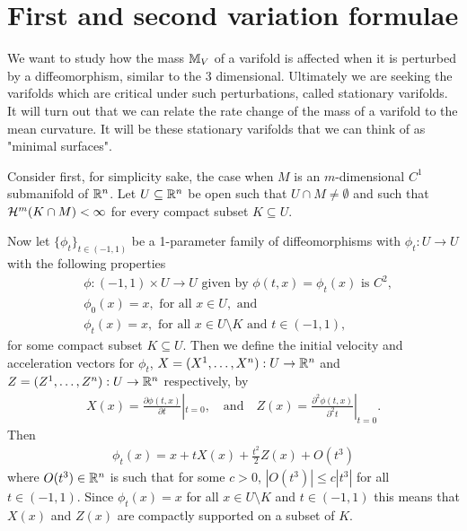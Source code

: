 \section{First and second variation formulae}
We want to study how the mass $\mathbb{M}_V$ of a varifold is affected when it is perturbed by a diffeomorphism, similar to the 3 dimensional. Ultimately we are seeking the varifolds which are critical under such perturbations, called stationary varifolds. It will turn out that we can relate the rate change of the mass of a varifold to the mean curvature. It will be these stationary varifolds that we can think of as "minimal surfaces".

Consider first, for simplicity sake, the case when $M$ is an $m$-dimensional $C^1$ submanifold of $\mathbb{R}^n$. Let $U \subseteq \mathbb{R}^n$ be open such that $U \cap M \neq \emptyset$ and such that $\mathcal{H}^m(K \cap M)<\infty$ for every compact subset $K \subseteq U$.

Now let $\{\phi_t\}_{t \in (-1,1)}$ be a 1-parameter family of diffeomorphisms with $\phi_t:U \to U$ with the following properties 
\begin{align}
     &\phi:(-1,1) \times U \to U \text { given by } \phi(t,x) = \phi_t(x) \text{ is } C^2,\\
    &\phi_0(x)=x, \text { for all } x \in U, \text{ and} \label{eq: C2 diff}\\
    &\phi_t(x) = x, \text{ for all } x \in U \setminus K \text{ and } t\in (-1,1),
\end{align}
for some compact subset $K\subseteq U$. Then we define the initial velocity and acceleration vectors for $\phi_t$, $X=(X^1, \dots, X^n):U \to \mathbb{R}^n$ and $Z=(Z^1, \dots, Z^n):U \to \mathbb{R}^n$ respectively, by
\begin{align}
    X(x) = \frac{\partial \phi(t,x)}{\partial t}|_{t=0}, \quad \text{and} \quad Z(x) = \frac{\partial^2 \phi(t,x)}{\partial^2 t}|_{t=0} \label{eq: x and z}.
\end{align}
Then
\begin{align}
    \phi_t(x) = x + tX(x) + \frac{t^2}{2}Z(x) + O(t^3)\label{eq: taylor}
\end{align}
where $O(t^3) \in \mathbb{R}^n$ is such that for some $c > 0$, $|O(t^3)| \le c|t^3|$ for all $t \in (-1,1)$. Since $\phi_t(x)=x$ for all $x \in U\setminus K$ and $t \in (-1,1)$ this means that $X(x)$ and $Z(x)$ are compactly supported on a subset of $K$.

